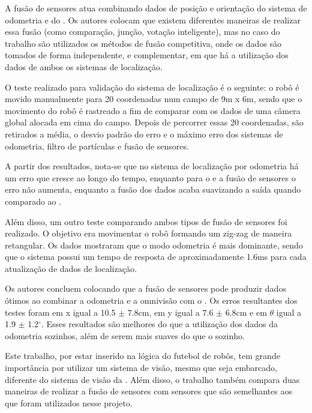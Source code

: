 \documentclass[acronym, symbols, table]{fei}
\begin{document}

A fusão de sensores atua combinando dados de posição e orientação do sistema de odometria e do . Os autores colocam que existem diferentes maneiras de realizar essa fusão (como comparação, junção, votação inteligente), mas no caso do trabalho são utilizados os métodos de fusão competitiva, onde os dados são tomados de forma independente, e complementar, em que há a utilização dos dados de ambos os sistemas de localização.

O teste realizado para validação do sistema de localização é o seguinte: o robô é movido manualmente para 20 coordenadas num campo de 9m x 6m, sendo que o movimento do robô é rastreado a fim de comparar com os dados de uma câmera global alocada em cima do campo. Depois de percorrer essas 20 coordenadas, são retirados a média, o desvio padrão do erro e o máximo erro dos sistemas de odometria, filtro de partículas e fusão de sensores.

A partir dos resultados, nota-se que no sistema de localização por odometria há um erro que cresce ao longo do tempo, enquanto para o  e a fusão de sensores o erro não aumenta, enquanto a fusão dos dados acaba suavizando a saída quando comparado ao .

Além disso, um outro teste comparando ambos tipos de fusão de sensores foi realizado. O objetivo era movimentar o robô formando um zig-zag de maneira retangular. Os dados mostraram que o modo odometria é mais dominante, sendo que o sistema possui um tempo de resposta de aproximadamente 1.6ms para cada atualização de dados de localização.

Os autores concluem colocando que a fusão de sensores pode produzir dados ótimos ao combinar a odometria e a omnivisão com o . Os erros resultantes dos testes foram em x igual a 10.5 $\pm$ 7.8cm, em y igual a 7.6 $\pm$ 6.8cm e em $\theta$ igual a 1.9 $\pm$ 1.2$^\circ$. Esses resultados são melhores do que a utilização dos dados da odometria sozinhos, além de serem mais suaves do que o  sozinho.

Este trabalho, por estar inserido na lógica do futebol de robôs, tem grande importância por utilizar um sistema de visão, mesmo que seja embarcado, diferente do sistema de visão da . Além disso, o trabalho também compara duas maneiras de realizar a fusão de sensores com sensores que são semelhantes aos que foram utilizados nesse projeto.
\end{document}
